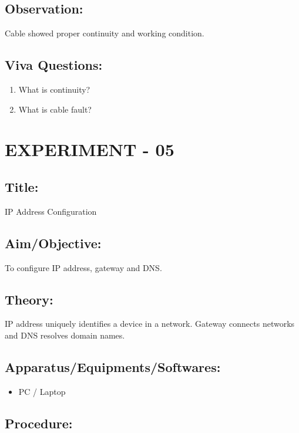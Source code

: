 \documentclass[a4paper,10pt]{article}
\begin{document}
\subsection{Observation:}
Cable showed proper continuity and working condition.

\subsection{Viva Questions:}
\begin{enumerate}
    \item What is continuity?
    \item What is cable fault?
\end{enumerate}

\newpage
\section{EXPERIMENT - 05}
\subsection{Title:}
IP Address Configuration

\subsection{Aim/Objective:}
To configure IP address, gateway and DNS.

\subsection{Theory:}
IP address uniquely identifies a device in a network. Gateway connects networks and DNS resolves domain names.

\subsection{Apparatus/Equipments/Softwares:}
\begin{itemize}
    \item PC / Laptop
\end{itemize}

\subsection{Procedure:}
\end{document}
